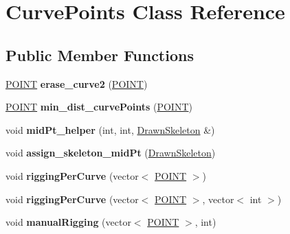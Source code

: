 \hypertarget{classCurvePoints}{\section{\-Curve\-Points \-Class \-Reference}
\label{classCurvePoints}
}
\subsection*{\-Public \-Member \-Functions}
\begin{DoxyCompactItemize}
\item 
\hypertarget{classCurvePoints_a8079243e2e447c8a8bbc007fb373e051}{\hyperlink{structPOINT}{\-P\-O\-I\-N\-T} {\bfseries erase\-\_\-curve2} (\hyperlink{structPOINT}{\-P\-O\-I\-N\-T})}\label{classCurvePoints_a8079243e2e447c8a8bbc007fb373e051}

\item 
\hypertarget{classCurvePoints_ada5417c6f98b520fc5e5ef091ee1b731}{\hyperlink{structPOINT}{\-P\-O\-I\-N\-T} {\bfseries min\-\_\-dist\-\_\-curve\-Points} (\hyperlink{structPOINT}{\-P\-O\-I\-N\-T})}\label{classCurvePoints_ada5417c6f98b520fc5e5ef091ee1b731}

\item 
\hypertarget{classCurvePoints_a0a727d9a92c3a95973841ae164f27bdc}{void {\bfseries mid\-Pt\-\_\-helper} (int, int, \hyperlink{classDrawnSkeleton}{\-Drawn\-Skeleton} \&)}\label{classCurvePoints_a0a727d9a92c3a95973841ae164f27bdc}

\item 
\hypertarget{classCurvePoints_a512ece764651989e4eb6858e05574937}{void {\bfseries assign\-\_\-skeleton\-\_\-mid\-Pt} (\hyperlink{classDrawnSkeleton}{\-Drawn\-Skeleton})}\label{classCurvePoints_a512ece764651989e4eb6858e05574937}

\item 
\hypertarget{classCurvePoints_adb767f38b5c7754f0fc40a00d63bc93f}{void {\bfseries rigging\-Per\-Curve} (vector$<$ \hyperlink{structPOINT}{\-P\-O\-I\-N\-T} $>$)}\label{classCurvePoints_adb767f38b5c7754f0fc40a00d63bc93f}

\item 
\hypertarget{classCurvePoints_ab2cc26e0f1bddfb23ea3e82246621768}{void {\bfseries rigging\-Per\-Curve} (vector$<$ \hyperlink{structPOINT}{\-P\-O\-I\-N\-T} $>$, vector$<$ int $>$)}\label{classCurvePoints_ab2cc26e0f1bddfb23ea3e82246621768}

\item 
\hypertarget{classCurvePoints_a12adb753c1a2d96adcda443d3e0c5655}{void {\bfseries manual\-Rigging} (vector$<$ \hyperlink{structPOINT}{\-P\-O\-I\-N\-T} $>$, int)}\label{classCurvePoints_a12adb753c1a2d96adcda443d3e0c5655}


\end{DoxyCompactItemize}
